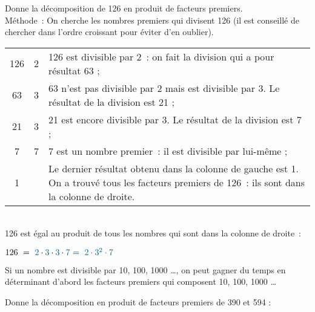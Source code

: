 \begin{methode*1}

\begin{exemple*1}
Donne la décomposition de 126 en produit de facteurs premiers.\\[1em]
Méthode : On cherche les nombres premiers qui divisent 126 (il est conseillé de chercher dans l'ordre croissant pour éviter d'en oublier). \\[1em]
\begin{tabularx}{\textwidth}{c|c|X}
 126 & \textcolor{A1}{2} & 126 est divisible par 2 : on fait la division qui a pour résultat 63 ; \\ 
 63 & \textcolor{A1}{3} & 63 n'est pas divisible par 2 mais est divisible par 3. Le résultat de la division est 21 ; \\
 21 & \textcolor{A1}{3} & 21 est encore divisible par 3. Le résultat de la division est 7 ; \\
7 & \textcolor{A1}{7} & 7 est un nombre premier : il est divisible par lui-même ; \\
1 & & Le dernier résultat obtenu dans la colonne de gauche est 1. On a trouvé tous les facteurs premiers de 126 : ils sont dans la colonne de droite. \\
\end{tabularx} \\[1em]
126 est égal au produit de tous les nombres qui sont dans la colonne de droite :
\begin{center} $126 = \textcolor{A1}{2} \cdot \textcolor{A1}{3} \cdot \textcolor{A1}{3} \cdot \textcolor{A1}{7} \textcolor{A1}{= 2 \cdot 3^2 \cdot 7}$ \end{center}
 \end{exemple*1}
 
\begin{remarque}
Si un nombre est divisible par 10, 100, 1000 \ldots, on peut gagner du temps en déterminant d'abord les facteurs premiers qui composent 10, 100, 1000 \ldots
\end{remarque}


\exercice  
Donne la décomposition en produit de facteurs premiers de 390 et 594 :


 \end{methode*1}
 
 
 \newpage
 
